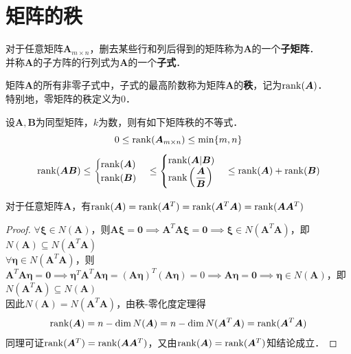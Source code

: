 \documentclass[12pt, a4paper, oneside, UTF8]{ctexbook}
\begin{document}
\section{矩阵的秩}
\begin{definition}
    对于任意矩阵$\bm{A}_{m \times n}$，删去某些行和列后得到的矩阵称为$\bm{A}$的一个\textbf{子矩阵}．\\
    并称$\bm{A}$的子方阵的行列式为$\bm{A}$的一个\textbf{子式}．\\
\end{definition}
\begin{definition}
    矩阵$\bm{A}$的所有\textcolor{Burgundy}{非零}子式中，子式的最高阶数称为矩阵$\bm{A}$的\textbf{秩}，记为$\mathrm{rank}(\bm{A})$．\\
    特别地，零矩阵的秩定义为0．
\end{definition}
\begin{theorem}
    设$\bm{A}, \bm{B}$为同型矩阵，$k$为数，则有如下矩阵秩的不等式．\footnotemark
    \[
            0 \leq \mathrm{rank}(\bm{A}_{m \times n}) \leq \min\{m,n\}
    \]
    \[
            \mathrm{rank}(\bm{A}\bm{B}) \leq \begin{cases}
                \mathrm{rank}(\bm{A})\\
                \mathrm{rank}(\bm{B})
            \end{cases} \leq \begin{cases}
                \mathrm{rank}(\bm{A}|\bm{B})\\
                \mathrm{rank}\left(\dfrac{\bm{A}}{\bm{B}}\right)
            \end{cases} \leq \mathrm{rank}(\bm{A}) + \mathrm{rank}(\bm{B})
    \]
\end{theorem}
\begin{theorem}
    对于任意矩阵$\bm{A}$，有$\mathrm{rank}(\bm{A}) = \mathrm{rank}(\bm{A}^T)=\mathrm{rank}(\bm{A}^T\bm{A})=
    \mathrm{rank}(\bm{A}\bm{A}^T)$
\end{theorem}
\begin{proof}
    $\forall \bm{\xi} \in N(\bm{A})$，则$\bm{A}\bm{\xi} = \bm{0} \implies \bm{A}^T\bm{A}\bm{\xi} = \bm{0} \implies \bm{\xi} \in N(\bm{A}^T\bm{A})$，即$N(\bm{A}) \subseteq N(\bm{A}^T\bm{A})$\\
    $\forall \bm{\eta} \in N(\bm{A}^T\bm{A})$，则$\bm{A}^T\bm{A}\bm{\eta} = \bm{0} \implies \bm{\eta}^T\bm{A}^T\bm{A}\bm{\eta} = (\bm{A}\bm{\eta})^T(\bm{A}\bm{\eta}) = 0 \implies \bm{A}\bm{\eta} = \bm{0} \implies \bm{\eta} \in N(\bm{A})$，即$N(\bm{A}^T\bm{A}) \subseteq N(\bm{A})$\\
    因此$N(\bm{A}) = N(\bm{A}^T\bm{A})$，由秩-零化度定理得
    \[
        \mathrm{rank}(\bm{A}) = n - \dim N(\bm{A}) = n - \dim N(\bm{A}^T\bm{A}) = \mathrm{rank}(\bm{A}^T\bm{A})
    \]
    同理可证$\mathrm{rank}(\bm{A}^T) = \mathrm{rank}(\bm{A}\bm{A}^T)$，又由$\mathrm{rank}(\bm{A}) = \mathrm{rank}(\bm{A}^T)$知结论成立．
\end{proof}
\end{document}
